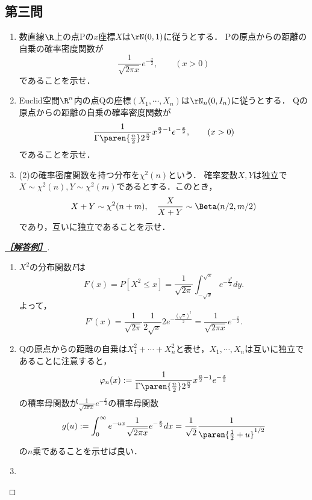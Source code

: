 \documentclass[uplatex,dvipdfmx]{jsarticle}
\begin{document}
\subsection{第三問}

\begin{tcolorbox}[colframe=ForestGreen, colback=ForestGreen!10!white,breakable,colbacktitle=ForestGreen!40!white,coltitle=black,fonttitle=\bfseries\sffamily,
    title=第３問]
    \begin{problem}\mbox{}
        \begin{enumerate}[{問}1]
            \item 数直線$\R$上の点Pの$x$座標$X$は$\rN(0,1)$に従うとする．
            Pの原点からの距離の自乗の確率密度関数が
            \[\frac{1}{\sqrt{2\pi x}}e^{-\frac{x}{2}},\qquad(x>0)\]
            であることを示せ．
            \item Euclid空間$\R^n$内の点Qの座標$(X_1,\cdots,X_n)$は$\rN_n(0,I_n)$に従うとする．
            Qの原点からの距離の自乗の確率密度関数が
            \[\frac{1}{\Gamma\paren{\frac{n}{2}}2^{\frac{n}{2}}}x^{\frac{n}{2}-1}e^{-\frac{x}{2}},\qquad(x>0)\]
            であることを示せ．
            \item (2)の確率密度関数を持つ分布を$\chi^2(n)$という．
            確率変数$X,Y$は独立で$X\sim\chi^2(n),Y\sim\chi^2(m)$であるとする．このとき，
            \[X+Y\sim\chi^2(n+m),\quad\frac{X}{X+Y}\sim\Beta(n/2,m/2)\]
            であり，互いに独立であることを示せ．
        \end{enumerate}
    \end{problem}
\end{tcolorbox}
\begin{proof}[\textbf{\underline{［解答例］}}]\mbox{}
    \begin{enumerate}
        \item $X^2$の分布関数$F$は
        \[F(x)=P[X^2\le x]=\frac{1}{\sqrt{2\pi}}\int^{\sqrt{x}}_{-\sqrt{x}}e^{-\frac{y^2}{2}}dy.\]
        よって，
        \[F'(x)=\frac{1}{\sqrt{2\pi}}\frac{1}{2\sqrt{x}}2e^{-\frac{(\sqrt{x})^2}{2}}=\frac{1}{\sqrt{2\pi x}}e^{-\frac{x}{2}}.\]
        \item Qの原点からの距離の自乗は$X_1^2+\cdots+X_n^2$と表せ，$X_1,\cdots,X_n$は互いに独立であることに注意すると，
        \[\varphi_n(x):=\frac{1}{\Gamma\paren{\frac{n}{2}}2^{\frac{n}{2}}}x^{\frac{n}{2}-1}e^{-\frac{x}{2}}\]
        の積率母関数が$\frac{1}{\sqrt{2\pi x}}e^{-\frac{x}{2}}$の積率母関数
        \[g(u):=\int^\infty_0e^{-ux}\frac{1}{\sqrt{2\pi x}}e^{-\frac{x}{2}}dx=\frac{1}{\sqrt{2}}\frac{1}{\paren{\frac{1}{2}+u}^{1/2}}\]
        の$n$乗であることを示せば良い．
        \item 
    \end{enumerate}
\end{proof}
\end{document}
